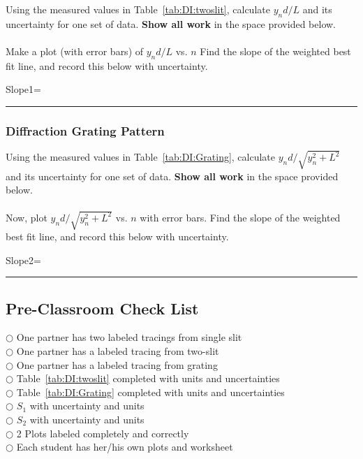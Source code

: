Using the measured values in Table~\ref{tab:DI:twoslit}, calculate
$y_nd/L$ and its uncertainty for one set of data.  
{\bf Show all work} in the space provided
below. \\
\vspace*{4cm} \\
\noindent Make a plot (with error bars) of $y_nd/L$ vs. $n$ 
Find the slope of the weighted best fit line, and record this
below with uncertainty.

\begin{center}
Slope1=~ \rule{3cm}{.1mm}
\end{center}


\subsubsection{Diffraction Grating Pattern}

Using the measured values in Table~\ref{tab:DI:Grating}, calculate
$y_nd/ \sqrt{y_n^2 + L^2}$ and its uncertainty for one set of data.  
{\bf Show all work} in the space provided below. \\
\vspace*{5cm} \\

\noindent Now, plot $y_nd/ \sqrt{y_n^2 + L^2}$ vs. $n$ with error bars. 
Find the
slope of the weighted best fit line, and record this below with
uncertainty.

\begin{center}
Slope2=~ \rule{3cm}{.1mm}
\end{center}

\subsection{Pre-Classroom Check List}
$\bigcirc$ \hspace*{1cm} One partner has two labeled tracings from single slit \\
$\bigcirc$ \hspace*{1cm} One partner has a labeled tracing from two-slit \\
$\bigcirc$ \hspace*{1cm} One partner has a labeled tracing from grating \\
$\bigcirc$ \hspace*{1cm} Table~\ref{tab:DI:twoslit} completed with units and uncertainties \\
$\bigcirc$ \hspace*{1cm} Table~\ref{tab:DI:Grating} completed with units and uncertainties \\
$\bigcirc$ \hspace*{1cm} $S_1$ with uncertainty and units \\
$\bigcirc$ \hspace*{1cm} $S_2$ with uncertainty and units \\
$\bigcirc$ \hspace*{1cm} 2 Plots labeled completely and correctly \\
$\bigcirc$ \hspace*{1cm} Each student has her/his own plots and worksheet \\
 


